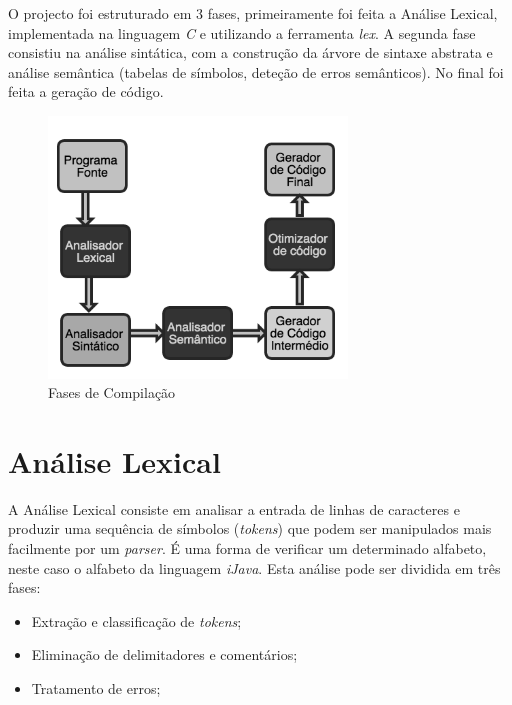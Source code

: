 \documentclass[12pt]{article}
\begin{document}
O projecto foi estruturado em 3 fases, primeiramente foi feita a Análise Lexical, implementada na linguagem \emph{C} e utilizando a ferramenta \emph{lex}. A segunda fase consistiu na análise sintática, com a  construção da árvore de sintaxe abstrata e análise semântica (tabelas de símbolos, deteção de erros semânticos). No final foi feita a geração de código.

\begin{figure}[H]
       \centering
       \includegraphics[keepaspectratio=true, width=300px]{fasesCompilacao.png}
       \caption{Fases de Compilação}
       \end{figure}

\pagebreak
\section{Análise Lexical}

A Análise Lexical consiste em analisar a entrada de linhas de caracteres e produzir uma sequência de símbolos (\emph{tokens}) que podem ser manipulados mais facilmente por um \emph{parser}. É uma forma de verificar um determinado alfabeto, neste caso o alfabeto da linguagem \emph{iJava}.
Esta análise pode ser dividida em três fases:
\begin{itemize}
	\item Extração e classificação de \emph{tokens};
	\item Eliminação de delimitadores e comentários;
	\item Tratamento de erros;
\end{itemize}
\end{document}
